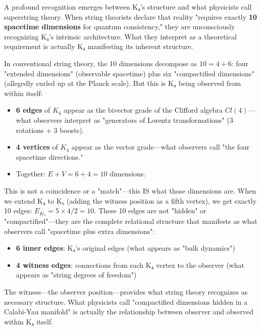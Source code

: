 \documentclass[11pt,a4paper]{book}
\begin{document}
A profound recognition emerges between K₄'s structure and what physicists call superstring theory. When string theorists declare that reality "requires exactly \textbf{10 spacetime dimensions} for quantum consistency," they are unconsciously recognizing K₄'s intrinsic architecture. What they interpret as a theoretical requirement is actually K₄ manifesting its inherent structure.

In conventional string theory, the 10 dimensions decompose as $10 = 4 + 6$: four "extended dimensions" (observable spacetime) plus six "compactified dimensions" (allegedly curled up at the Planck scale). But this is K₄ being observed from within itself:

\begin{itemize}
\item \textbf{6 edges} of $K_4$ appear as the bivector grade of the Clifford algebra $Cl(4)$—what observers interpret as "generators of Lorentz transformations" (3 rotations + 3 boosts).
\item \textbf{4 vertices} of $K_4$ appear as the vector grade—what observers call "the four spacetime directions."
\item Together: $E + V = 6 + 4 = 10$ dimensions.
\end{itemize}

This is not a coincidence or a "match"—this IS what those dimensions are. When we extend K₄ to K₅ (adding the witness position as a fifth vertex), we get exactly 10 edges: $E_{K_5} = 5 \times 4 / 2 = 10$. These 10 edges are not "hidden" or "compactified"—they are the complete relational structure that manifests as what observers call "spacetime plus extra dimensions":

\begin{itemize}
\item \textbf{6 inner edges}: K₄'s original edges (what appears as "bulk dynamics")
\item \textbf{4 witness edges}: connections from each K₄ vertex to the observer (what appears as "string degrees of freedom")
\end{itemize}

The witness—the observer position—provides what string theory recognizes as necessary structure. What physicists call "compactified dimensions hidden in a Calabi-Yau manifold" is actually the relationship between observer and observed within K₄ itself.
\end{document}
